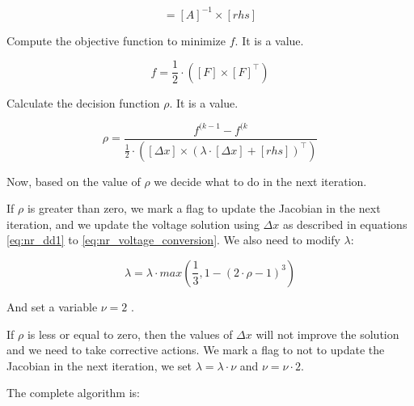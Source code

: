 \documentclass[nols,a4paper,twoside,symmetric,notoc,fleqn]{tufte-book}
\begin{document}
\begin{equation}
[\Delta x] = [A]^{-1} \times [rhs]
\label{eq:lm_solve}
\end{equation}


Compute the objective function to minimize $f$. It is a value.

\begin{equation}
f = \frac{1}{2} \cdot \left([F] \times [F]^\top \right)
\label{eq:lm_f}
\end{equation}

Calculate the decision function $\rho$. It is a value.


\begin{equation}
\rho = \frac{f^{(k-1}-f^{(k}}{\frac{1}{2} \cdot \left([\Delta x] \times (\lambda \cdot [\Delta x] + [rhs])^\top \right)}
\label{eq:lm_rho}
\end{equation}

Now, based on the value of $\rho$ we decide what to do in the next iteration.

If $\rho$ is greater than zero, we mark a flag to update the Jacobian in the next iteration, and we update the voltage solution using $\Delta x$ as described in equations  \ref{eq:nr_dd1} to \ref{eq:nr_voltage_conversion}. We also need to modify $\lambda$:


\begin{equation}
\lambda = \lambda \cdot max \left( \frac{1}{3}, 1-(2\cdot \rho -1)^3 \right)
\label{eq:lm_update_l}
\end{equation}

And set a variable $\nu=2$ .


If $\rho$ is less or equal to zero, then the values of $\Delta x$ will not improve the solution and we need to take corrective actions. We mark a flag to not to update the Jacobian in the next iteration, we set $\lambda=\lambda \cdot \nu$ and $\nu = \nu \cdot 2$.


The complete algorithm is: 
\end{document}
